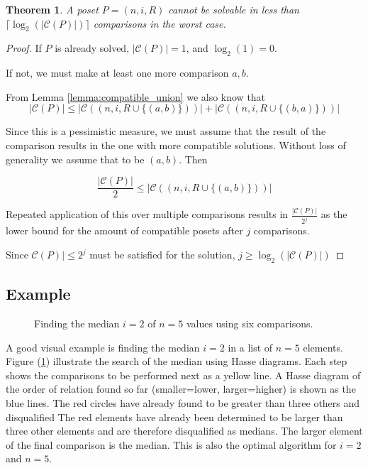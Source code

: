 \documentclass[10pt,journal,compsoc]{IEEEtran}
\newtheorem{theorem}{Theorem}
\begin{document}
\begin{theorem}\label{theorem:compatible_log}
  A poset $P=(n,i,R)$ cannot be solvable in less than $\lceil\log_2(|\mathcal{C}(P)|)\rceil$ comparisons in the worst case.
\end{theorem}
\begin{proof}
  If $P$ is already solved, $|\mathcal{C}(P)|=1$, and $\log_2(1)=0$.

  If not, we must make at least one more comparison $a, b$.

  From Lemma \ref{lemma:compatible_union} we also know that
  $$|\mathcal{C}(P)| \leq |\mathcal{C}((n,i,R\cup \{(a, b)\}))| + |\mathcal{C}((n,i,R\cup \{(b, a)\}))|$$

  Since this is a pessimistic measure, we must assume that the result of the comparison
  results in the one with more compatible solutions. Without loss
  of generality we assume that to be $(a, b)$. Then

  $$\frac{|\mathcal{C}(P)|}{2}\leq |\mathcal{C}((n,i,R\cup \{(a, b)\}))|$$

  Repeated application of this over multiple comparisons results in
  $\frac{|\mathcal{C}(P)|}{2^j}$
  as the lower bound for the amount of compatible posets
  after $j$ comparisons.

  Since $\mathcal{C}(P)|\leq 2^j$ must be satisfied for the solution, $j\geq\log_2(|\mathcal{C}(P)|)$
\end{proof}


\subsection{Example}
\begin{figure}[h!]
  \centering
  
  \caption{Finding the median $i=2$ of $n=5$ values using six comparisons.}
  \label{fig:median_of_5}
\end{figure}
A good visual example is finding the median $i=2$ in a list of $n=5$ elements. Figure
(\ref{fig:median_of_5}) illustrate the search of the median using Hasse diagrams. Each step shows
the comparisons to be performed next as a yellow line. A Hasse diagram of the order of relation
found so far (smaller=lower, larger=higher) is shown as the blue lines. The red circles have already
found to be greater than three others and disqualified The red elements have already been determined
to be larger than three other elements and are therefore disqualified as medians. The larger
element of the final comparison is the median. This is also the optimal algorithm for $i=2$ and
$n=5$.
\end{document}

